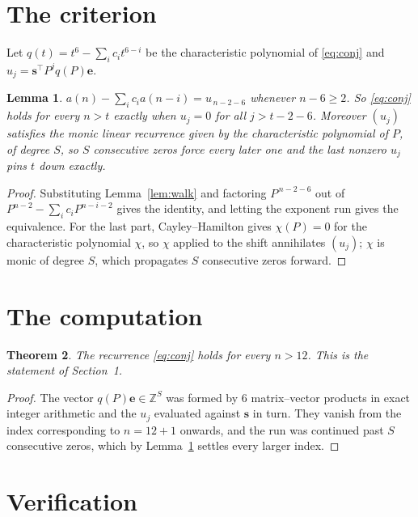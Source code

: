\documentclass[11pt,a4paper]{article}
\theoremstyle{plain}
\newtheorem{theorem}{Theorem}
\newtheorem{lemma}[theorem]{Lemma}
\theoremstyle{definition}
\begin{document}
\section{The criterion}

Let $q(t)=t^{6}-\sum_i c_i t^{6-i}$ be the characteristic polynomial of
\eqref{eq:conj} and $u_j=\mathbf{s}^{\!\top}P^{j}q(P)\mathbf{e}$.

\begin{lemma}\label{lem:crit}
$a(n)-\sum_i c_i a(n-i)=u_{\,n-2-6}$ whenever $n-6\ge2$. So \eqref{eq:conj}
holds for every $n>t$ exactly when $u_j=0$ for all $j>t-2-6$. Moreover $(u_j)$
satisfies the monic linear recurrence given by the characteristic polynomial of $P$, of
degree $S$, so $S$ consecutive zeros force every later one and the last nonzero $u_j$ pins
$t$ down exactly.
\end{lemma}

\begin{proof}
Substituting Lemma~\ref{lem:walk} and factoring $P^{\,n-2-6}$ out of
$P^{n-2}-\sum_i c_i P^{n-i-2}$ gives the identity, and letting the exponent run gives the
equivalence. For the last part, Cayley--Hamilton gives $\chi(P)=0$ for the characteristic
polynomial $\chi$, so $\chi$ applied to the shift annihilates $(u_j)$; $\chi$ is monic of
degree $S$, which propagates $S$ consecutive zeros forward.
\end{proof}

\section{The computation}

\begin{theorem}
The recurrence \eqref{eq:conj} holds for every $n>12$. This is the statement of
Section~1.
\end{theorem}

\begin{proof}
The vector $q(P)\mathbf{e}\in\mathbb{Z}^{S}$ was formed by $6$ matrix--vector
products in exact integer arithmetic and the $u_j$ evaluated against $\mathbf{s}$ in turn.
They vanish from the index corresponding to $n=12+1$ onwards, and the run was continued
past $S$ consecutive zeros, which by Lemma~\ref{lem:crit} settles every larger index.
\end{proof}

\section{Verification}
\end{document}
